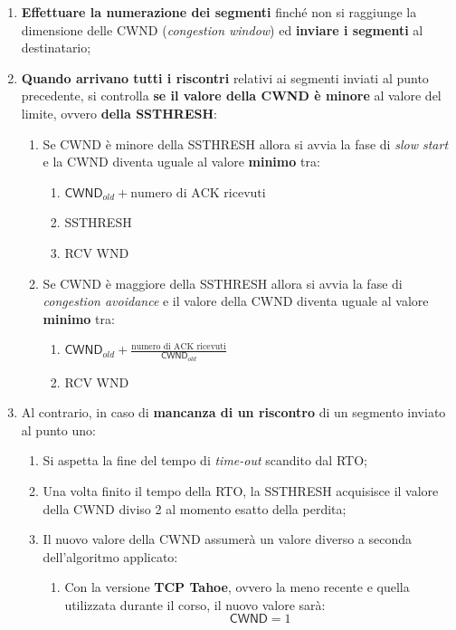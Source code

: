 \documentclass[a4paper]{article}
\begin{document}
	\begin{enumerate}
		\item \textbf{Effettuare la numerazione dei segmenti} finché non si raggiunge la dimensione delle \textsf{CWND} (\emph{congestion window}) ed \textbf{inviare i segmenti} al destinatario;
		
		\item \textbf{Quando arrivano tutti i riscontri} relativi ai segmenti inviati al punto precedente, si controlla \textbf{se il valore della \textsf{CWND} è minore} al valore del limite, ovvero \textbf{della \textsf{SSTHRESH}}:
		\begin{enumerate}
			\item Se \textsf{CWND} è minore della \textsf{SSTHRESH} allora si avvia la fase di \emph{slow start} e la \textsf{CWND} diventa uguale al valore \textbf{minimo} tra:
			\begin{enumerate}
				\item $\textsf{CWND}_{old} + \text{numero di ACK ricevuti}$
				\item \textsf{SSTHRESH}
				\item \textsf{RCV WND}
			\end{enumerate}
			
			\item Se \textsf{CWND} è maggiore della \textsf{SSTHRESH} allora si avvia la fase di \emph{congestion avoidance} e il valore della \textsf{CWND} diventa uguale al valore \textbf{minimo} tra:
			\begin{enumerate}
				\item $\textsf{CWND}_{old} + \frac{\text{numero di ACK ricevuti}}{\textsf{CWND}_{old}}$
				\item \textsf{RCV WND}
			\end{enumerate}
		\end{enumerate}
		
		\item Al contrario, in caso di \textbf{mancanza di un riscontro} di un segmento inviato al punto uno:
		\begin{enumerate}
			\item Si aspetta la fine del tempo di \emph{time-out} scandito dal RTO;
			
			\item Una volta finito il tempo della RTO, la SSTHRESH acquisisce il valore della CWND diviso 2 al momento esatto della perdita;
			
			\item Il nuovo valore della CWND assumerà un valore diverso a seconda dell'algoritmo applicato:
			\begin{enumerate}
				\item Con la versione \textbf{TCP Tahoe}, ovvero la meno recente e quella utilizzata durante il corso, il nuovo valore sarà:
				\begin{equation*}
					\textsf{CWND} = 1
				\end{equation*}
				

\end{enumerate}
\end{enumerate}
\end{enumerate}
\end{document}
